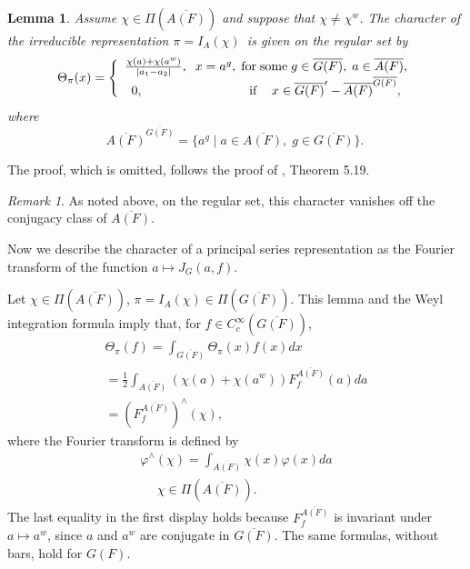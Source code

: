 \documentclass[12pt,letterpaper]{book}
\theoremstyle{plain}
\newtheorem{lemma}[theorem]{Lemma}
\theoremstyle{definition}
\theoremstyle{remark}
\newtheorem{remark}[theorem]{Remark}
\theoremstyle{remark}
\begin{document}
\begin{lemma}
Assume $\chi\in \Pi (\overline{A(F)})$ and suppose
that $\chi \neq \chi ^w$. The character of the
irreducible representation $\pi =I_{A}(\chi )$\ is given on the regular
set by
\[
\Theta _\pi (x)=\left\{
\begin{array}{c}
\frac{\chi (a)+\chi (a^w)}{|a_1-a_2|},
\;\;x=a^g,\;{\rm for\;some}\;g\in \overline{G(F)},
\;a\in \overline{A(F)}, \\
0,\;\;\;\;\;\;\;\;\;\;\;\;\;\;\;\;\;\;\;\;\;\;\;\;\;\;\;\;\;
{\rm \;if\;}\;\;\;
x\in \overline{G(F)}^{\prime }-\overline{A(F)}^{\overline{G(F)}},
\end{array}
\right.
\]
where
\[
\overline{A(F)}^{\overline{G(F)}}=\{a^g\;|\;a\in \overline{A(F)},\;g\in
\overline{G(F)}\}.\
\]
\end{lemma}

The proof, which is omitted, follows the proof of \cite{Ge1}, Theorem 5.19.

\begin{remark} As noted above, on the regular set,
this character vanishes off the conjugacy class of $\overline{A(F)}$.
\end{remark}

Now we describe the character of a principal series representation
as the Fourier transform of the function $a\longmapsto J_G(a,f)$.

Let $\chi \in \Pi (\overline{A(F)})$,
$\pi =I_{A}(\chi )\in \Pi (\overline{G(F)})$.
This lemma and the Weyl integration formula
imply that, for $f\in C_c^\infty
(\overline{G(F)})$,
\begin{equation}
\begin{array}{c}
\Theta _\pi (f)=\int_{\overline{G(F)}}\Theta _\pi (x)f(x)dx \\
=\frac 12\int_{\overline{A(F)}}(\chi (a)+
\chi(a^w))F_f^{\overline{A(F)}}(a)da \\
=(F_f^{\overline{A(F)}})^{\wedge }(\chi ) ,
\end{array}
\end{equation}
where the Fourier transform is defined by
\begin{equation}
\begin{array}{c}
\varphi ^{\wedge }(\chi )=\int_{\overline{A(F)}}\chi (x)\varphi
(x)da \\
\ \ \ \ \ \ \chi \in \Pi (\overline{A(F)}).
\end{array}
\end{equation}
The last equality in the first display holds because $F_f^{\overline{A(F)}}$ is
invariant under $a\mapsto a^w$, since $a$ and $a^w$ are conjugate in
$\overline{G(F)}$. The same formulas, without bars, hold for $G(F)$.
\end{document}
